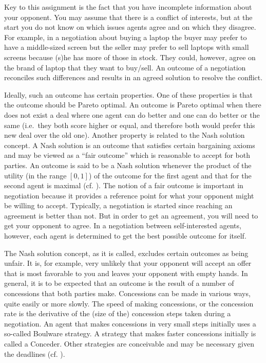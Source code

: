 \documentclass[a4paper]{article}
\begin{document}
Key to this assignment is the fact that you have incomplete information about your opponent. You may assume that there is a conflict of interests, but at the start you do not know on which issues agents agree and on which they disagree. For example, in a negotiation about buying a laptop the buyer may prefer to have a middle-sized screen but the seller may prefer to sell laptops with small screens because (s)he has more of those in stock. They could, however, agree on the brand of laptop that they want to buy/sell. An outcome of a negotiation reconciles such differences and results in an agreed solution to resolve the conflict.

Ideally, such an outcome has certain properties. One of these properties is that the outcome should be Pareto optimal. An outcome is Pareto optimal when there does not exist a deal where one agent can do better and one can do better or the same (i.e.\ they both score higher or equal, and therefore both would prefer this new deal over the old one). Another property is related to the Nash solution concept. A Nash solution is an outcome that satisfies certain bargaining axioms and may be viewed as a ``fair outcome'' which is reasonable to accept for both parties. An outcome is said to be a Nash solution whenever the product of the utility (in the range $[0, 1]$) of the outcome for the first agent and that for the second agent is maximal (cf. \cite{Ser05}). The notion of a fair outcome is important in negotiation because it provides a reference point for what your opponent might be willing to accept. Typically, a negotiation is started since reaching an agreement is better than not. But in order to get an agreement, you will need to get your opponent to agree. In a negotiation between self-interested agents, however, each agent is determined to get the best possible outcome for itself.

The Nash solution concept, as it is called, excludes certain outcomes as being unfair. It is, for example, very unlikely that your opponent will accept an offer that is most favorable to you and leaves your opponent with empty hands. In general, it is to be expected that an outcome is the result of a number of concessions that both parties make. Concessions can be made in various ways, quite easily or more slowly. The speed of making concessions, or the concession rate is the derivative of the (size of the) concession steps taken during a negotiation. An agent that makes concessions in very small steps initially uses a so-called Boulware strategy. A strategy that makes faster concessions  initially is called a Conceder. Other strategies are conceivable and may be necessary given the deadlines (cf. \cite{Fat01}).
\end{document}
